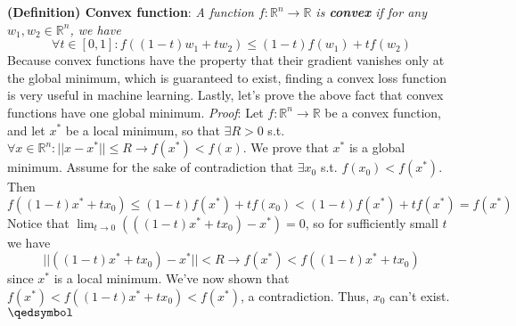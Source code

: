 \documentclass{article}
\begin{document}
\newline
\textbf{(Definition) Convex function}: \textit{A function $ f : \mathbb{R}^n \rightarrow \mathbb{R} $ is \textbf{convex} if for any $ w_1, w_2 \in \mathbb{R}^n $, we have}
$$ \forall t \in [0, 1]: f \left( (1 - t) w_1 + t w_2 \right) \leq (1 - t) f(w_1) + t f(w_2) $$
Because convex functions have the property that their gradient vanishes only at the global minimum, which is guaranteed to exist, finding a convex loss function is very useful in machine learning. Lastly, let's prove the above fact that convex functions have one global minimum.
\newline
\textit{Proof}: Let $ f: \mathbb{R}^n \rightarrow \mathbb{R} $ be a convex function, and let $ x^* $ be a local minimum, so that $ \exists R > 0 $ s.t. $ \forall x \in \mathbb{R}^n: ||x - x^*|| \leq R \rightarrow f(x^*) < f(x) $. We prove that $ x^* $ is a global minimum. Assume for the sake of contradiction that $ \exists x_0 $ s.t. $ f(x_0) < f(x^*) $. Then
$$ f((1 - t) x^* + t x_0) \leq (1 - t) f(x^*) + t f(x_0) < (1 - t) f(x^*) + t f(x^*) = f(x^*) $$
Notice that $ \lim_{t \to 0} (((1 - t) x^* + t x_0) - x^*) = 0 $, so for sufficiently small $ t $ we have
$$ ||((1 - t) x^* + t x_0) - x^*|| < R \rightarrow f(x^*) < f((1 - t) x^* + t x_0) $$
since $ x^* $ is a local minimum. We've now shown that $ f(x^*) < f((1 - t) x^* + t x_0) < f(x^*) $, a contradiction. Thus, $ x_0 $ can't exist. $ \qedsymbol $
\end{document}
